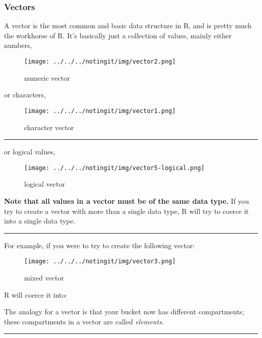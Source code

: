 \documentclass[
]{article}
\begin{document}
\hypertarget{vectors}{%
\subsubsection{Vectors}\label{vectors}}

A vector is the most common and basic data structure in R, and is pretty
much the workhorse of R. It's basically just a collection of values,
mainly either numbers,

\begin{figure}
\centering
\texttt{[image: ../../../notingit/img/vector2.png]}
\caption{numeric vector}
\end{figure}

or characters,

\begin{figure}
\centering
\texttt{[image: ../../../notingit/img/vector1.png]}
\caption{character vector}
\end{figure}

\begin{center}\rule{0.5\linewidth}{0.5pt}\end{center}

or logical values,

\begin{figure}
\centering
\texttt{[image: ../../../notingit/img/vector5-logical.png]}
\caption{logical vector}
\end{figure}

\textbf{Note that all values in a vector must be of the same data type.}
If you try to create a vector with more than a single data type, R will
try to coerce it into a single data type.

\begin{center}\rule{0.5\linewidth}{0.5pt}\end{center}

For example, if you were to try to create the following vector:

\begin{figure}
\centering
\texttt{[image: ../../../notingit/img/vector3.png]}
\caption{mixed vector}
\end{figure}

R will coerce it into:

The analogy for a vector is that your bucket now has different
compartments; these compartments in a vector are called \emph{elements}.

\begin{center}\rule{0.5\linewidth}{0.5pt}\end{center}
\end{document}
